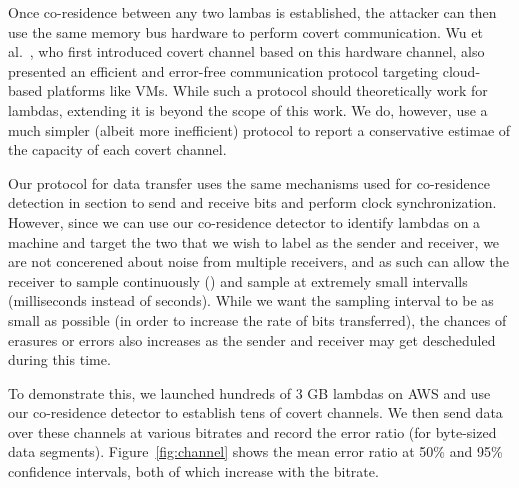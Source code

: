 Once co-residence between any two lambas is established, the attacker can then
use the same memory bus hardware to perform covert communication. Wu et
al.~\cite{wuusenix2012}, who first introduced covert channel based on this
hardware channel, also presented an efficient and error-free communication
protocol targeting cloud-based platforms like VMs.  While such a protocol should
theoretically work for lambdas, extending it is beyond the scope of this work.
We do, however, use a much simpler (albeit more inefficient) protocol to report
a conservative estimae of the capacity of each covert channel.

Our protocol for data transfer uses the same mechanisms used for co-residence
detection in section  to send and receive bits and perform clock
synchronization. However, since we can use our co-residence detector to identify
lambdas on a machine and target the two that we wish to label as the sender and
receiver, we are not concerened about noise from multiple receivers, and as such
can allow the receiver to sample continuously () and sample at
extremely small intervalls (milliseconds instead of seconds). While we want the
sampling interval to be as small as possible (in order to increase the rate of
bits transferred), the chances of erasures or errors also increases as the
sender and receiver may get descheduled during this time. 

To demonstrate this, we launched hundreds of 3 GB lambdas on AWS and use our
co-residence detector to establish tens of covert channels. We then send data
over these channels at various bitrates and record the error ratio (for
byte-sized data segments). Figure~\ref{fig:channel} shows the mean error ratio
at 50\% and 95\% confidence intervals, both of which increase with the bitrate.


